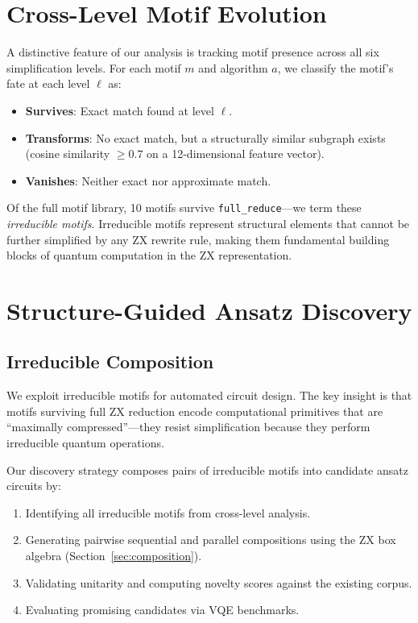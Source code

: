 \documentclass[twocolumn,prl,amsmath,amssymb,superscriptaddress]{revtex4-2}
\begin{document}
\section{Cross-Level Motif Evolution}
\label{sec:cross_level}

A distinctive feature of our analysis is tracking motif presence across all six simplification levels.
For each motif $m$ and algorithm $a$, we classify the motif's fate at each level $\ell$ as:
\begin{itemize}
    \item \textbf{Survives}: Exact match found at level $\ell$.
    \item \textbf{Transforms}: No exact match, but a structurally similar subgraph exists (cosine similarity $\geq 0.7$ on a 12-dimensional feature vector).
    \item \textbf{Vanishes}: Neither exact nor approximate match.
\end{itemize}

Of the full motif library, 10 motifs survive \texttt{full\_reduce}---we term these \emph{irreducible motifs}.
Irreducible motifs represent structural elements that cannot be further simplified by any ZX rewrite rule, making them fundamental building blocks of quantum computation in the ZX representation.

\section{Structure-Guided Ansatz Discovery}
\label{sec:ansatz_discovery}

\subsection{Irreducible Composition}

We exploit irreducible motifs for automated circuit design.
The key insight is that motifs surviving full ZX reduction encode computational primitives that are ``maximally compressed''---they resist simplification because they perform irreducible quantum operations.

Our discovery strategy composes pairs of irreducible motifs into candidate ansatz circuits by:
\begin{enumerate}
    \item Identifying all irreducible motifs from cross-level analysis.
    \item Generating pairwise sequential and parallel compositions using the ZX box algebra (Section~\ref{sec:composition}).
    \item Validating unitarity and computing novelty scores against the existing corpus.
    \item Evaluating promising candidates via VQE benchmarks.
\end{enumerate}
\end{document}
